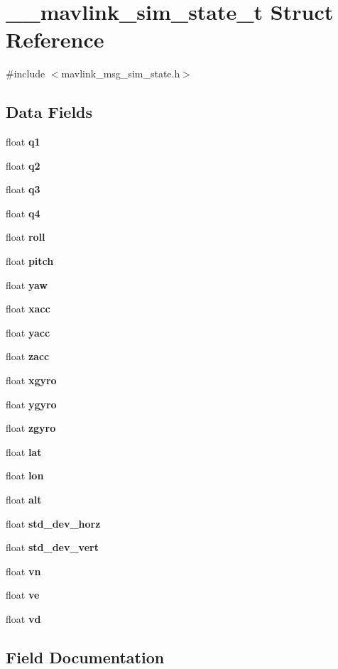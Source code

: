 \section{\+\_\+\+\_\+mavlink\+\_\+sim\+\_\+state\+\_\+t Struct Reference}
\label{struct____mavlink__sim__state__t}


{\ttfamily \#include $<$mavlink\+\_\+msg\+\_\+sim\+\_\+state.\+h$>$}

\subsection*{Data Fields}
\begin{DoxyCompactItemize}
\item 
float \textbf{ q1}
\item 
float \textbf{ q2}
\item 
float \textbf{ q3}
\item 
float \textbf{ q4}
\item 
float \textbf{ roll}
\item 
float \textbf{ pitch}
\item 
float \textbf{ yaw}
\item 
float \textbf{ xacc}
\item 
float \textbf{ yacc}
\item 
float \textbf{ zacc}
\item 
float \textbf{ xgyro}
\item 
float \textbf{ ygyro}
\item 
float \textbf{ zgyro}
\item 
float \textbf{ lat}
\item 
float \textbf{ lon}
\item 
float \textbf{ alt}
\item 
float \textbf{ std\+\_\+dev\+\_\+horz}
\item 
float \textbf{ std\+\_\+dev\+\_\+vert}
\item 
float \textbf{ vn}
\item 
float \textbf{ ve}
\item 
float \textbf{ vd}
\end{DoxyCompactItemize}


\subsection{Field Documentation}
\mbox{\label{struct____mavlink__sim__state__t_adbf37c628254d78394e4533464a31a8a}} 
